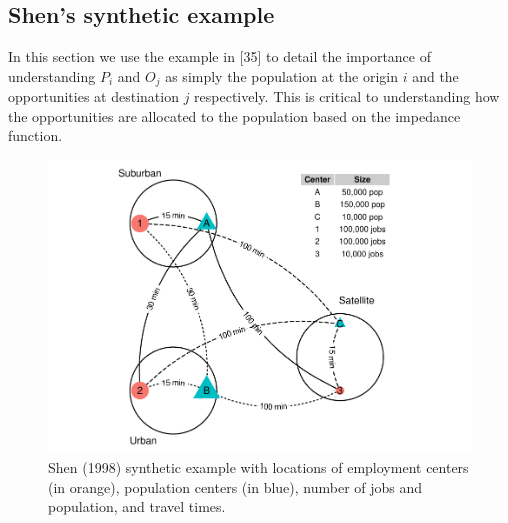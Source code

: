 \documentclass[10pt,letterpaper]{article}
\begin{document}
\hypertarget{shens-synthetic-example}{%
\subsection{Shen's synthetic example}\label{shens-synthetic-example}}

In this section we use the example in {[}35{]} to detail the importance
of understanding \(P_i\) and \(O_j\) as simply the population at the
origin \(i\) and the opportunities at destination \(j\) respectively.
This is critical to understanding how the opportunities are allocated to
the population based on the impedance function.

\begin{figure}

{\centering \includegraphics[width=1\linewidth]{Spatial-Availability-Paper_files/figure-latex/create-figure-with-toy-example-1} 

}

\caption{\label{fig:plot-toy-example} Shen (1998) synthetic example with locations of employment centers (in orange), population centers (in blue), number of jobs and population, and travel times.}\label{fig:create-figure-with-toy-example}
\end{figure}

 
  \providecommand{\huxb}[2]{\arrayrulecolor[RGB]{#1}\global\arrayrulewidth=#2pt}
  \providecommand{\huxvb}[2]{\color[RGB]{#1}\vrule width #2pt}
  \providecommand{\huxtpad}[1]{\rule{0pt}{#1}}
  \providecommand{\huxbpad}[1]{\rule[-#1]{0pt}{#1}}
\end{document}

